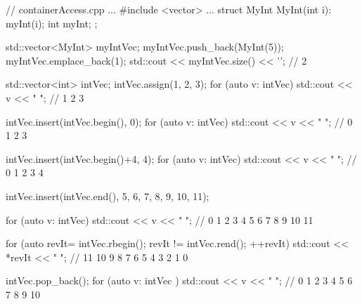 \begin{cpp}
// containerAccess.cpp
...
#include <vector>
...
struct MyInt{
	MyInt(int i): myInt(i){};
	int myInt;
};

std::vector<MyInt> myIntVec;
myIntVec.push_back(MyInt(5));
myIntVec.emplace_back(1);
std::cout << myIntVec.size() << '\n'; // 2

std::vector<int> intVec;
intVec.assign({1, 2, 3});
for (auto v: intVec) std::cout << v << " "; // 1 2 3

intVec.insert(intVec.begin(), 0);
for (auto v: intVec) std::cout << v << " "; // 0 1 2 3

intVec.insert(intVec.begin()+4, 4);
for (auto v: intVec) std::cout << v << " "; // 0 1 2 3 4

intVec.insert(intVec.end(), {5, 6, 7, 8, 9, 10, 11});

for (auto v: intVec) std::cout << v << " "; // 0 1 2 3 4 5 6 7 8 9 10 11

for (auto revIt= intVec.rbegin(); revIt != intVec.rend(); ++revIt)
	std::cout << *revIt << " "; // 11 10 9 8 7 6 5 4 3 2 1 0

intVec.pop_back();
for (auto v: intVec ) std::cout << v << " "; // 0 1 2 3 4 5 6 7 8 9 10
\end{cpp}















